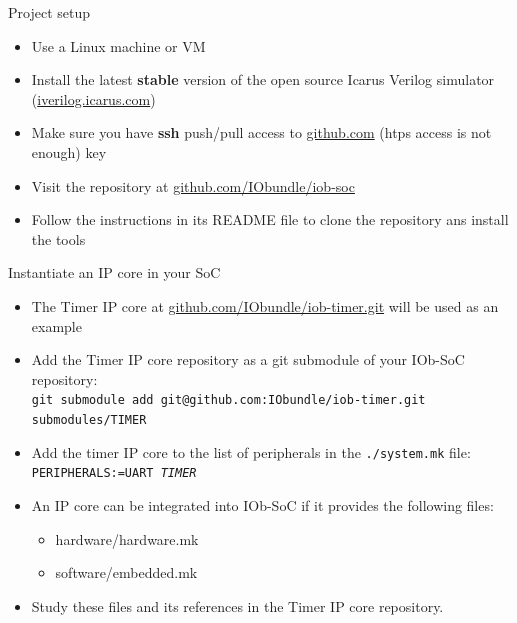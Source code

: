 \documentclass [xcolor=svgnames, t] {beamer}
\begin{document}
\begin{frame}{Project setup}
\begin{center}
  \begin{itemize}
    \item Use a Linux machine or VM
    \item Install the latest {\bf stable} version of the open source Icarus Verilog simulator (\url{iverilog.icarus.com})
    \item Make sure you have {\bf ssh} push/pull access to \url{github.com} (htps access is not enough)
      key
    \item Visit the repository at \url{github.com/IObundle/iob-soc}
    \item Follow the instructions in its README file to clone the repository ans install the tools
  \end{itemize}
\end{center}
\end{frame}


\begin{frame}{Instantiate an IP core in your SoC}
  \begin{itemize}
  \item The Timer IP core at \url{github.com/IObundle/iob-timer.git} will be used as an example
  \item Add the Timer IP core repository as a git submodule of your IOb-SoC repository:\\
    {\tt \tiny git submodule add git@github.com:IObundle/iob-timer.git submodules/TIMER}
  \item Add the timer IP core to the list of peripherals in the {\tt ./system.mk} file:\\
    {\tt PERIPHERALS:=UART {\em TIMER}}
  \item An IP core can be integrated into IOb-SoC if it provides the following files: 
    \begin{itemize}
    \item hardware/hardware.mk
    \item software/embedded.mk
    \end{itemize}
  \item Study these files and its references in the Timer IP core repository.
  \end{itemize}
\end{frame}
\end{document}
